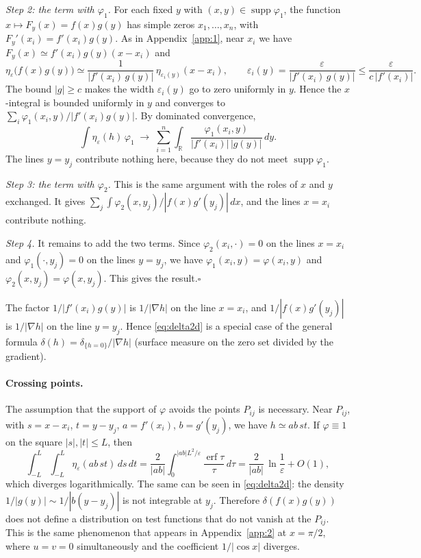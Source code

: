 \documentclass[11pt]{article}
\newcommand{\R}{\mathbb{R}}
\begin{document}
\emph{Step 2: the term with $\varphi_1$.} For each fixed $y$ with
$(x,y)\in\operatorname{supp}\varphi_1$, the function
$x\mapsto F_y(x)=f(x)g(y)$ has simple zeros $x_1,\dots,x_n$, with
$F_y'(x_i)=f'(x_i)g(y)$. As in Appendix~\ref{app:1}, near $x_i$ we have
$F_y(x)\simeq f'(x_i)g(y)(x-x_i)$ and
\[
  \eta_\varepsilon\bigl(f(x)g(y)\bigr)\simeq
  \frac{1}{|f'(x_i)\,g(y)|}\,\eta_{\varepsilon_i(y)}(x-x_i),
  \qquad
  \varepsilon_i(y)=\frac{\varepsilon}{|f'(x_i)\,g(y)|}\le\frac{\varepsilon}{c\,|f'(x_i)|}.
\]
The bound $|g|\ge c$ makes the width $\varepsilon_i(y)$ go to zero uniformly
in $y$. Hence the $x$-integral is bounded uniformly in $y$ and converges to
$\sum_i\varphi_1(x_i,y)/|f'(x_i)g(y)|$. By dominated convergence,
\[
  \int\eta_\varepsilon(h)\,\varphi_1\;\longrightarrow\;
  \sum_{i=1}^{n}\int_\R\frac{\varphi_1(x_i,y)}{|f'(x_i)|\,|g(y)|}\,dy .
\]
The lines $y=y_j$ contribute nothing here, because they do not meet
$\operatorname{supp}\varphi_1$.

\emph{Step 3: the term with $\varphi_2$.} This is the same argument with the
roles of $x$ and $y$ exchanged. It gives
$\sum_j\int\varphi_2(x,y_j)/|f(x)g'(y_j)|\,dx$, and the lines $x=x_i$
contribute nothing.

\emph{Step 4.} It remains to add the two terms. Since $\varphi_2(x_i,\cdot)=0$
on the lines $x=x_i$ and $\varphi_1(\cdot,y_j)=0$ on the lines $y=y_j$, we have
$\varphi_1(x_i,y)=\varphi(x_i,y)$ and $\varphi_2(x,y_j)=\varphi(x,y_j)$. This
gives the result.$\square$


The factor $1/|f'(x_i)g(y)|$ is $1/|\nabla h|$ on the line $x=x_i$, and
$1/|f(x)g'(y_j)|$ is $1/|\nabla h|$ on the line $y=y_j$. Hence
\eqref{eq:delta2d} is a special case of the general formula
$\delta(h)=\delta_{\{h=0\}}/|\nabla h|$ (surface measure on the zero set
divided by the gradient).

\paragraph{Crossing points.} The assumption that the support of $\varphi$
avoids the points $P_{ij}$ is necessary. Near $P_{ij}$, with $s=x-x_i$,
$t=y-y_j$, $a=f'(x_i)$, $b=g'(y_j)$, we have $h\simeq ab\,st$. If
$\varphi\equiv1$ on the square $|s|,|t|\le L$, then
\[
  \int_{-L}^{L}\!\!\int_{-L}^{L}\eta_\varepsilon(ab\,st)\,ds\,dt
  =\frac{2}{|ab|}\int_0^{|ab|L^2/\varepsilon}\frac{\operatorname{erf}\tau}{\tau}\,d\tau
  =\frac{2}{|ab|}\,\ln\frac{1}{\varepsilon}+O(1),
\]
which diverges logarithmically. The same can be seen in \eqref{eq:delta2d}:
the density $1/|g(y)|\sim1/|b(y-y_j)|$ is not integrable at $y_j$. Therefore
$\delta(f(x)g(y))$ does not define a distribution on test functions that do
not vanish at the $P_{ij}$. This is the same phenomenon that appears in
Appendix~\ref{app:2} at $x=\pi/2$, where $u=v=0$ simultaneously and the
coefficient $1/|\cos x|$ diverges.
\end{document}
